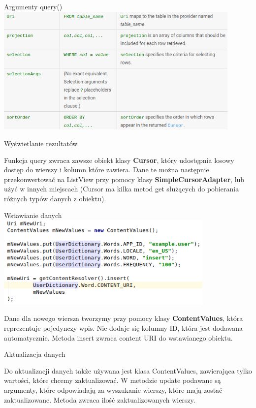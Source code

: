\documentclass{beamer}
\begin{document}
\begin{frame}{Argumenty query()}
	\centering
	\includegraphics[width=0.9\textwidth]{query-args}
\end{frame}

\begin{frame}{Wyświetlanie rezultatów}
	\begin{block}{}
		Funkcja query zwraca zawsze obiekt klasy \textbf{Cursor}, który udostępnia losowy dostęp do wierszy i kolumn które zawiera. Dane te można następnie przekonwertować na ListView przy pomocy klasy \textbf{SimpleCursorAdapter}, lub użyć w innych miejscach (Cursor ma kilka metod get służących do pobierania różnych typów danych z obiektu).
	\end{block}
\end{frame}

\begin{frame}{Wstawianie danych}
	\centering
	\includegraphics[width=0.8\textwidth]{insert}
	\begin{block}{}
		Dane dla nowego wiersza tworzymy przy pomocy klasy \textbf{ContentValues}, która reprezentuje pojedynczy wpis. Nie dodaje się kolumny ID, która jest dodawana automatycznie. Metoda insert zwraca content URI do wstawianego obiektu.
	\end{block}
\end{frame}

\begin{frame}{Aktualizacja danych}
	\begin{block}{}
		Do aktualizacji danych także używana jest klasa ContentValues, zawierająca tylko wartości, które chcemy zaktualizować. W metodzie update podawane są argumenty, które odpowiadają za wyszukanie wierszy, które mają zostać zaktualizowane. Metoda zwraca ilość zaktualizowanych wierszy.
	\end{block}
\end{frame}
\end{document}

